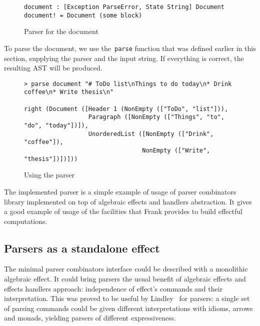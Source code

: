       \begin{figure}[h]
      \begin{lstlisting}
document : [Exception ParseError, State String] Document
document! = Document (some block)
      \end{lstlisting}
      \caption{Parser for the document}
      \label{listing:parserMdDocCombo}
      \end{figure}

      To parse the document, we use the~\texttt{parse} function that was defined earlier
      in this section, supplying the parser and the input string. If everything is
      correct, the resulting AST will be produced.


      \begin{figure}[h]
      \begin{lstlisting}
> parse document "# ToDo list\nThings to do today\n* Drink coffee\n* Write thesis\n"

right (Document ([Header 1 (NonEmpty (["ToDo", "list"])),
                  Paragraph ([NonEmpty (["Things", "to", "do", "today"])]),
                  UnorderedList ([NonEmpty (["Drink", "coffee"]),
                                 NonEmpty (["Write", "thesis"])])]))
      \end{lstlisting}
      \caption{Using the parser}
      \label{listing:parserExprMainCombo}
      \end{figure}

      The implemented parser is a simple example of usage of parser combinators library
      implemented on top of algebraic effects and handlers abstraction. It gives a
      good example of usage of the facilities that Frank provides to build
      effectful computations.

  \subsection{Parsers as a standalone effect}

    The minimal parser combinators interface could be described with a monolithic
    algebraic effect. It could bring parsers the usual benefit of algebraic effects
    and effects handlers approach: independence of effect's commands and their interpretation.
    This was proved to be useful by Lindley~\cite{Lindley:2014:AEE:2633628.2633636}
    for parsers: a single set of parsing commands could be given different interpretations
    with idioms, arrows and monads, yielding parsers of different expressiveness.

